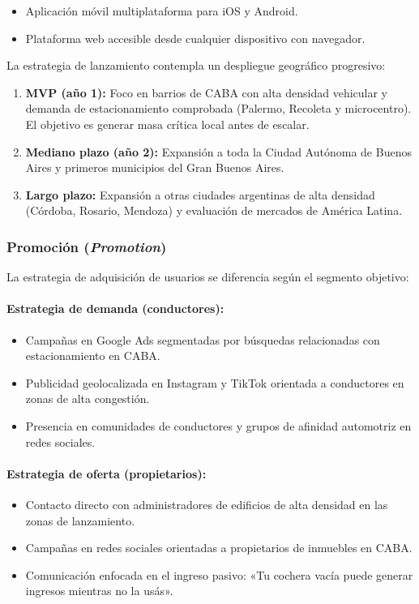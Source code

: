 \begin{itemize}
    \item Aplicación móvil multiplataforma para iOS y Android.
    \item Plataforma web accesible desde cualquier dispositivo con navegador.
\end{itemize}

La estrategia de lanzamiento contempla un despliegue geográfico progresivo:

\begin{enumerate}
    \item \textbf{MVP (año 1):} Foco en barrios de CABA con alta densidad vehicular y demanda de estacionamiento comprobada (Palermo, Recoleta y microcentro). El objetivo es generar masa crítica local antes de escalar.
    \item \textbf{Mediano plazo (año 2):} Expansión a toda la Ciudad Autónoma de Buenos Aires y primeros municipios del Gran Buenos Aires.
    \item \textbf{Largo plazo:} Expansión a otras ciudades argentinas de alta densidad (Córdoba, Rosario, Mendoza) y evaluación de mercados de América Latina.
\end{enumerate}

\subsubsection{Promoción (\textit{Promotion})}

La estrategia de adquisición de usuarios se diferencia según el segmento objetivo:

\paragraph{Estrategia de demanda (conductores):}
\begin{itemize}
    \item Campañas en Google Ads segmentadas por búsquedas relacionadas con estacionamiento en CABA.
    \item Publicidad geolocalizada en Instagram y TikTok orientada a conductores en zonas de alta congestión.
    \item Presencia en comunidades de conductores y grupos de afinidad automotriz en redes sociales.
\end{itemize}

\paragraph{Estrategia de oferta (propietarios):}
\begin{itemize}
    \item Contacto directo con administradores de edificios de alta densidad en las zonas de lanzamiento.
    \item Campañas en redes sociales orientadas a propietarios de inmuebles en CABA.
    \item Comunicación enfocada en el ingreso pasivo: «Tu cochera vacía puede generar ingresos mientras no la usás».
\end{itemize}


